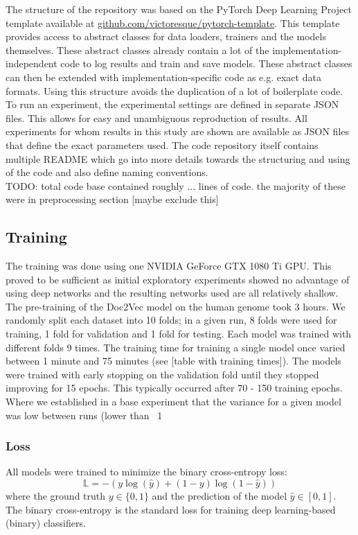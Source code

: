 The structure of the repository was based on the PyTorch Deep Learning Project template available at \url{github.com/victoresque/pytorch-template}. This template provides access to abstract classes for data loaders, trainers and the models themselves. These abstract classes already contain a lot of the implementation-independent code to log results and train and save models. These abstract classes can then be extended with implementation-specific code as e.g. exact data formats. Using this structure avoids the duplication of a lot of boilerplate code.\\
To run an experiment, the experimental settings are defined in separate JSON files. This allows for easy and unambiguous reproduction of results. All experiments for whom results in this study are shown are available as JSON files that define the exact parameters used.
The code repository itself contains multiple README which go into more details towards the structuring and using of the code and also define naming conventions.\\

TODO: total code base contained roughly ... lines of code. the majority of these were in preprocessing section [maybe exclude this]

\subsection{Training} \label{subsec:training_details}
The training was done using one NVIDIA GeForce GTX 1080 Ti GPU. This proved to be sufficient as initial exploratory experiments showed no advantage of using deep networks and the resulting networks used are all relatively shallow. The pre-training of the Doc2Vec model on the human genome took 3 hours. We randomly split each dataset into 10 folds; in a given run, 8 folds were used for training, 1 fold for validation and 1 fold for testing. Each model was trained with different folds 9 times.
The training time for training a single model once varied between 1 minute and 75 minutes (see [table with training times]). The models were trained with early stopping on the validation fold until they stopped improving for 15 epochs. This typically occurred after 70 - 150 training epochs.
Where we established in a base experiment that the variance for a given model was low between runs (lower than ~1%
\subsubsection{Loss}  \label{subsubsec:loss}
All models were trained to minimize the binary cross-entropy loss:
$$\mathbb{L} = - (y \log(\hat{y}) + (1 - y) \log (1 - \hat{y}))$$
where the ground truth $y \in \{0, 1\}$ and the prediction of the model $\hat{y} \in [0, 1]$. The binary cross-entropy is the standard loss for training deep learning-based (binary) classifiers.
